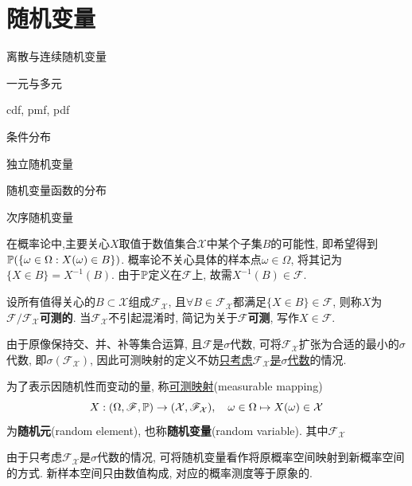 \chapter{随机变量}

\begin{introduction}
    \item 离散与连续随机变量
    \item 一元与多元
    \item cdf, pmf, pdf
    \item 条件分布
    \item 独立随机变量
    \item 随机变量函数的分布
    \item 次序随机变量
\end{introduction}

在概率论中,主要关心$X$取值于数值集合$\mathcal{X}$中某个子集$B$的可能性, 即希望得到$\P(\{\omega\in\Omega : X(\omega) \in B\})$. 概率论不关心具体的样本点$\omega\in\Omega$, 将其记为$\{X \in B\} = X^{-1}(B)$. 由于$\P$定义在$\mathscr{F}$上, 故需$X^{-1}(B) \in \mathscr{F}$.

\begin{definition}[可测性]
    设所有值得关心的$B\subset \mathcal{X}$组成$\mathscr{F}_{\mathcal{X}}$, 且$\forall B \in \mathscr{F}_{\mathcal{X}}$都满足$\{X\in B\} \in \mathscr{F}$, 则称$X$为$\mathscr{F}/\mathscr{F}_{\mathcal{X}}$\textbf{可测的}. 当$\mathscr{F}_{\mathcal{X}}$不引起混淆时, 简记为关于$\mathscr{F}$\textbf{可测}, 写作$X \in \mathscr{F}$.
\end{definition}

由于原像保持交、并、补等集合运算, 且$\mathscr{F}$是$\sigma$代数, 可将$\mathscr{F}_{\mathcal{X}}$扩张为合适的最小的$\sigma$代数, 即$\sigma(\mathscr{F}_{\mathcal{X}})$, 因此可测映射的定义不妨\underline{只考虑$\mathscr{F}_{\mathcal{X}}$是$\sigma$代数}的情况.



\begin{definition}[随机变量]
    为了表示因随机性而变动的量, 称\underline{可测映射}(measurable mapping)
    \[ X : (\Omega,\mathscr{F},\P) \to (\mathcal{X},\mathscr{F}_{\mathcal{X}}), \quad \omega\in\Omega \mapsto X(\omega)\in\mathcal{X} \]
    为\textbf{随机元}(random element), 也称\textbf{随机变量}(random variable). 其中$\mathscr{F}_{\mathcal{X}}$
\end{definition}

由于只考虑$\mathscr{F}_{\mathcal{X}}$是$\sigma$代数的情况, 可将随机变量看作将原概率空间映射到新概率空间的方式. 新样本空间只由数值构成, 对应的概率测度等于原象的.

